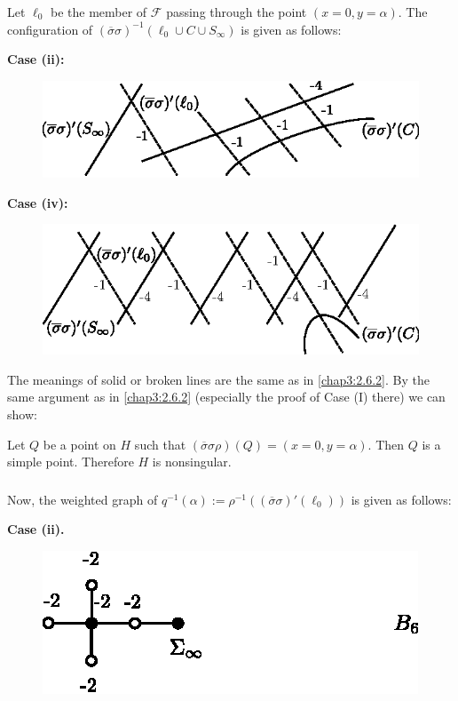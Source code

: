 \subsubsection{}\label{chap3:2.9.3}
Let $\ell_{0}$ be the member of $\mathscr{F}$ passing through the
point $(x=0,y=\alpha)$. The configuration of
$(\overline{\sigma}\sigma)^{-1}(\ell_{0}\cup C\cup S_{\infty})$ is
given as follows:

\medskip
\noindent
{\bf Case (ii):}
\begin{figure}[H]
\centering
\includegraphics{figures/miyansi_fig25.eps}
\end{figure}

\noindent
{\bf Case (iv):}\pageoriginale\
\begin{figure}[H]
\centering
\includegraphics{figures/miyansi_fig26.eps}
\end{figure}
The meanings of solid or broken lines are the same as in
\ref{chap3:2.6.2}. By the same argument as in \ref{chap3:2.6.2} (especially the
proof of Case (I) there) we can show:

\begin{lemma*}
Let $Q$ be a point on $H$ such that
$(\overline{\sigma}\sigma\rho)(Q)=(x=0,y=\alpha)$. Then $Q$ is a
simple point. Therefore $H$ is nonsingular.
\end{lemma*}

\subsubsection{}\label{chap3:2.9.4}
Now, the weighted graph of
$q^{-1}(\alpha):=\rho^{-1}((\overline{\sigma}\sigma)'(\ell_{0}))$ is
given as follows:

\medskip
\noindent
{\bf Case (ii).}
\begin{figure}[H]
\centering
\includegraphics{figures/miyansi_fig27.eps}
\end{figure}


